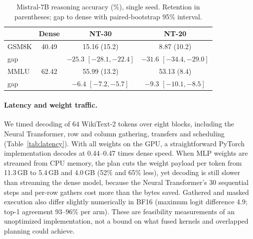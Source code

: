 \documentclass[10pt,twocolumn,letterpaper]{article}
\begin{document}
\begin{table}[t]
\centering
\caption{Mistral-7B reasoning accuracy (\%), single seed. Retention in parentheses; gap to dense with paired-bootstrap 95\% interval.}
\label{tab:reason}
\small
\setlength{\tabcolsep}{3pt}
\begin{tabular}{@{}lccc@{}}
\toprule
 & Dense & NT-30 & NT-20 \\
\midrule
GSM8K & 40.49 & 15.16 {\footnotesize (15.2)} & 8.87 {\footnotesize (10.2)} \\
 gap & & $-25.3$ {\footnotesize $[-28.1,-22.4]$} & $-31.6$ {\footnotesize $[-34.4,-29.0]$} \\
\addlinespace
MMLU & 62.42 & 55.99 {\footnotesize (13.2)} & 53.13 {\footnotesize (8.4)} \\
 gap & & $-6.4$ {\footnotesize $[-7.2,-5.7]$} & $-9.3$ {\footnotesize $[-10.1,-8.5]$} \\
\bottomrule
\end{tabular}
\end{table}

\paragraph{Latency and weight traffic.} We timed decoding of 64 WikiText-2 tokens over eight blocks, including the Neural Transformer, row and column gathering, transfers and scheduling (Table~\ref{tab:latency}). With all weights on the GPU, a straightforward PyTorch implementation decodes at 0.44--0.47 times dense speed. When MLP weights are streamed from CPU memory, the plan cuts the weight payload per token from 11.3\,GB to 5.4\,GB and 4.0\,GB (52\% and 65\% less), yet decoding is still slower than streaming the dense model, because the Neural Transformer's 30 sequential steps and per-row gathers cost more than the bytes saved. Gathered and masked execution also differ slightly numerically in BF16 (maximum logit difference 4.9; top-1 agreement 93--96\% per arm). These are feasibility measurements of an unoptimized implementation, not a bound on what fused kernels and overlapped planning could achieve.
\end{document}
